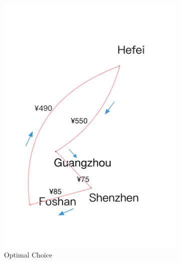 \documentclass{extarticle}
\begin{document}
\begin{figure}[!ht]
\begin{subfigure}{0.3\textwidth}
      \includegraphics[width=\textwidth]{pic/2.png}
      \caption{Optimal Choice}%
\label{fig:your_image2}
  \end{subfigure}%
  \hfill %
  \begin{subfigure}{0.3\textwidth}

\end{subfigure}
\end{figure}
\end{document}

